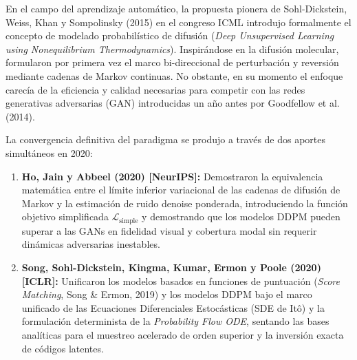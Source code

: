 En el campo del aprendizaje automático, la propuesta pionera de Sohl-Dickstein, Weiss, Khan y Sompolinsky (2015) en el congreso ICML introdujo formalmente el concepto de modelado probabilístico de difusión (\textit{Deep Unsupervised Learning using Nonequilibrium Thermodynamics}). Inspirándose en la difusión molecular, formularon por primera vez el marco bi-direccional de perturbación y reversión mediante cadenas de Markov continuas. No obstante, en su momento el enfoque carecía de la eficiencia y calidad necesarias para competir con las redes generativas adversarias (GAN) introducidas un año antes por Goodfellow et al. (2014).

La convergencia definitiva del paradigma se produjo a través de dos aportes simultáneos en 2020:
\begin{enumerate}[leftmargin=1.5em, itemsep=0.15cm]
    \item \textbf{Ho, Jain y Abbeel (2020) [NeurIPS]:} Demostraron la equivalencia matemática entre el límite inferior variacional de las cadenas de difusión de Markov y la estimación de ruido denoise ponderada, introduciendo la función objetivo simplificada $\mathcal{L}_{\mathrm{simple}}$ y demostrando que los modelos DDPM pueden superar a las GANs en fidelidad visual y cobertura modal sin requerir dinámicas adversarias inestables.
    \item \textbf{Song, Sohl-Dickstein, Kingma, Kumar, Ermon y Poole (2020) [ICLR]:} Unificaron los modelos basados en funciones de puntuación (\textit{Score Matching}, Song \& Ermon, 2019) y los modelos DDPM bajo el marco unificado de las Ecuaciones Diferenciales Estocásticas (SDE de Itô) y la formulación determinista de la \textit{Probability Flow ODE}, sentando las bases analíticas para el muestreo acelerado de orden superior y la inversión exacta de códigos latentes.
\end{enumerate}

\vspace{0.3cm}
